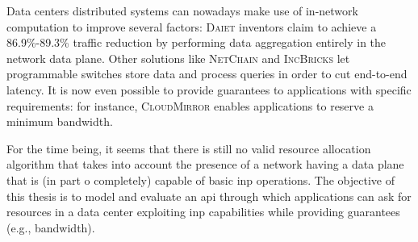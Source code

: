 Data centers distributed systems can nowadays make use of in-network computation to improve several factors: \textsc{Daiet} \cite{daiet} inventors claim to achieve a 86.9\%-89.3\% traffic reduction by performing data aggregation entirely in the network data plane.
Other solutions like \textsc{NetChain} \cite{netchain} and \textsc{IncBricks} \cite{incbricks} let programmable switches store data and process queries in order to cut end-to-end latency.
It is now even possible to provide guarantees to applications with specific requirements: for instance, \textsc{CloudMirror} \cite{cloudmirror} enables applications to reserve a minimum bandwidth.\par
For the time being, it seems that there is still no valid resource allocation algorithm that takes into account the presence of a network having a data plane that is (in part o completely) capable of basic \gls{inp} operations.
The objective of this thesis is to model and evaluate an \gls{api} through which applications can ask for resources in a data center exploiting \gls{inp} capabilities while providing guarantees (e.g., bandwidth).